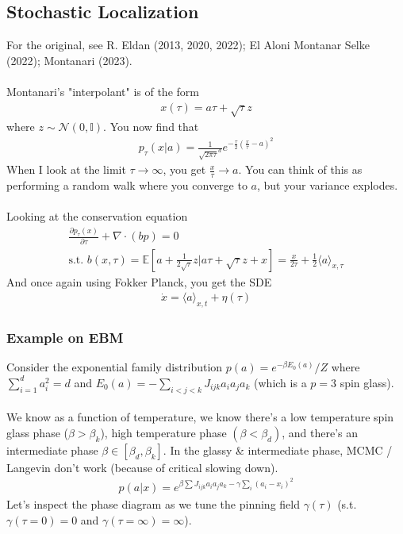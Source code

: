 \subsection{Stochastic Localization}
For the original, see R. Eldan (2013, 2020, 2022); El Aloni Montanar Selke (2022); Montanari (2023).\\
\\
Montanari's "interpolant" is of the form
\begin{align}
	x(\tau) = a\tau + \sqrt{\tau} z
\end{align}
where $z \sim \mathcal N(0, \mathbb I)$. You now find that
\begin{align}
	p_\tau(x|a) = \frac{1}{\sqrt{2\pi \tau}^d} e^{-\frac{\tau}{2}(\frac{x}{\tau} - a)^2}
\end{align}
When I look at the limit $\tau \to \infty$, you get $\frac{x}{\tau} \to a$. You can think of this as performing a random walk where you converge to $a$, but your variance explodes.\\
\\
Looking at the conservation equation
\begin{align}
	\frac{\partial p_\tau(x)}{\partial \tau} + \nabla \cdot (bp) = 0\\
	\text{s.t. } b(x,\tau)= \mathbb E[a + \frac{1}{2\sqrt \tau} z | a \tau + \sqrt{\tau} z + x]  = \frac{x}{2\tau} + \frac{1}{2}\langle a \rangle_{x,\tau}
\end{align}
And once again using Fokker Planck, you get the SDE
\begin{align}
	\dot x = \langle a \rangle_{x,t} + \eta(\tau)
\end{align}
\subsubsection{Example on EBM}
Consider the exponential family distribution $p(a) = e^{- \beta E_0(a)}/Z$ where $\sum_{i=1}^d a_i^2 = d$ and $E_0(a) = - \sum_{i < j < k} J_{ijk} a_i a_j a_k$ (which is a $p=3$ spin glass).\\
\\
We know as a function of temperature, we know there's a low temperature spin glass phase ($\beta > \beta_{k}$),  high temperature phase $(\beta < \beta_{d})$, and there's an intermediate phase $\beta \in [\beta_{d}, \beta_{k}]$. In the glassy \& intermediate phase, MCMC / Langevin don't work (because of critical slowing down).
\begin{align}
	p(a|x) = e^{\beta \sum J_{ijk} a_i a_j a_k  - \gamma \sum_i (a_i -  x_i)^2} 
\end{align}
Let's inspect the phase diagram as we tune the pinning field $\gamma(\tau)$ (s.t. $\gamma(\tau = 0) = 0$ and $\gamma(\tau = \infty) = \infty$). 

